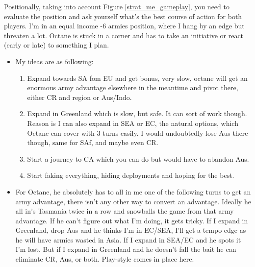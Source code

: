 Positionally, taking into account Figure \ref{strat_me_gameplay}, you need to evaluate the position and ask yourself what's the best course of action for both players. I'm in an equal income -6 armies position, where I hang by an edge but threaten a lot. Octane is stuck in a corner and has to take an initiative or react (early or late) to something I plan.
\begin{itemize}
    \item My ideas are as following:
    \begin{enumerate}
        \item Expand towards SA fom EU and get bonus, very slow, octane will get an enormous army advantage elsewhere in the meantime and pivot there, either CR and region or Aus/Indo.
        \item Expand in Greenland which is slow, but safe. It can sort of work though. Reason is I can also expand in SEA or EC, the natural options, which Octane can cover with 3 turns easily. I would undoubtedly lose Aus there though, same for SAf, and maybe even CR.
        \item Start a journey to CA which you can do but would have to abandon Aus.
        \item Start faking everything, hiding deployments and hoping for the best.
    \end{enumerate}
    \item For Octane, he absolutely has to all in me one of the following turns to get an army advantage, there isn't any other way to convert an advantage. Ideally he all in's Tasmania twice in a row and snowballs the game from that army advantage. If he can't figure out what I'm doing, it gets tricky. If I expand in Greenland, drop Aus and he thinks I'm in EC/SEA, I'll get a tempo edge as he will have armies wasted in Asia. If I expand in SEA/EC and he spots it I'm lost. But if I expand in Greenland and he doesn't fall the bait he can eliminate CR, Aus, or both. Play-style comes in place here.
\end{itemize}

